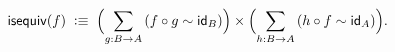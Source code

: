 \documentclass[hott-all.tex]{subfiles}
\begin{document}
\begin{equation}\label{eq:isequiv-invertible}
  \isequiv(f) \;\defeq\;
  \Parens{\sm{g:B\to A} (f\circ g \htpy \idfunc[B])}
  \times
  \Parens{\sm{h:B\to A} (h\circ f \htpy \idfunc[A])}.
\end{equation}
%
\end{document}
